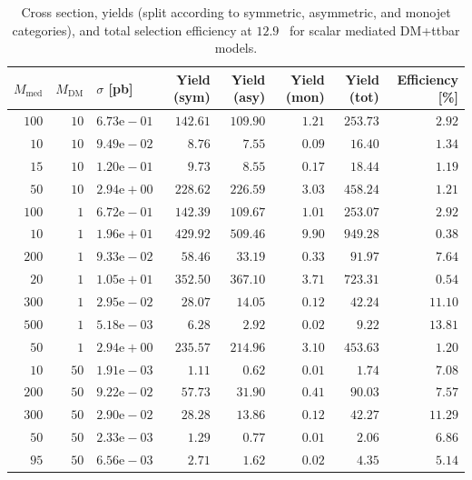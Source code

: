 \begin{table}
    \centering
    {\small
    \begin{tabular}{rrlrrrrr}
    \hline\hline
    $M_{\text{med}}$ & $M_{\text{DM}}$ & $\sigma$ [pb] & Yield (sym) & Yield (asy) & Yield (mon) & Yield (tot) & Efficiency [\%] \\
    \hline
    $100$ & $10$ & $6.73\text{e}-01$ & $142.61$ & $109.90$ & $1.21$ & $253.73$ & $2.92$  \\
    $10$  & $10$ & $9.49\text{e}-02$ & $8.76$   & $7.55$   & $0.09$ & $16.40$  & $1.34$  \\
    $15$  & $10$ & $1.20\text{e}-01$ & $9.73$   & $8.55$   & $0.17$ & $18.44$  & $1.19$  \\
    $50$  & $10$ & $2.94\text{e}+00$ & $228.62$ & $226.59$ & $3.03$ & $458.24$ & $1.21$  \\
    $100$ & $1$  & $6.72\text{e}-01$ & $142.39$ & $109.67$ & $1.01$ & $253.07$ & $2.92$  \\
    $10$  & $1$  & $1.96\text{e}+01$ & $429.92$ & $509.46$ & $9.90$ & $949.28$ & $0.38$  \\
    $200$ & $1$  & $9.33\text{e}-02$ & $58.46$  & $33.19$  & $0.33$ & $91.97$  & $7.64$  \\
    $20$  & $1$  & $1.05\text{e}+01$ & $352.50$ & $367.10$ & $3.71$ & $723.31$ & $0.54$  \\
    $300$ & $1$  & $2.95\text{e}-02$ & $28.07$  & $14.05$  & $0.12$ & $42.24$  & $11.10$ \\
    $500$ & $1$  & $5.18\text{e}-03$ & $6.28$   & $2.92$   & $0.02$ & $9.22$   & $13.81$ \\
    $50$  & $1$  & $2.94\text{e}+00$ & $235.57$ & $214.96$ & $3.10$ & $453.63$ & $1.20$  \\
    $10$  & $50$ & $1.91\text{e}-03$ & $1.11$   & $0.62$   & $0.01$ & $1.74$   & $7.08$  \\
    $200$ & $50$ & $9.22\text{e}-02$ & $57.73$  & $31.90$  & $0.41$ & $90.03$  & $7.57$  \\
    $300$ & $50$ & $2.90\text{e}-02$ & $28.28$  & $13.86$  & $0.12$ & $42.27$  & $11.29$ \\
    $50$  & $50$ & $2.33\text{e}-03$ & $1.29$   & $0.77$   & $0.01$ & $2.06$   & $6.86$  \\
    $95$  & $50$ & $6.56\text{e}-03$ & $2.71$   & $1.62$   & $0.02$ & $4.35$   & $5.14$  \\
    \hline\hline
    \end{tabular}
    }
    \caption{Cross section, yields (split according to symmetric, asymmetric, 
        and monojet categories), and total selection efficiency at $12.9$~\ifb 
        for scalar mediated DM+ttbar models.}
    \label{tab:DMttS_yld}
\end{table}


